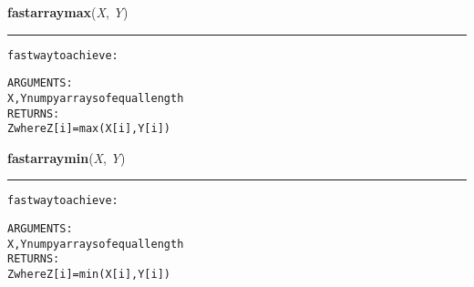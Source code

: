     \label{System:Utils:fastarraymax}

    \vspace{0.5ex}

\hspace{.8\funcindent}\begin{boxedminipage}{\funcwidth}

    \raggedright \textbf{fastarraymax}(\textit{X}, \textit{Y})

    \vspace{-1.5ex}

    \rule{\textwidth}{0.5\fboxrule}
\setlength{\parskip}{2ex}
\begin{alltt}

fast way to achieve: 

ARGUMENTS:
        X,Y numpy arrays of equal length
RETURNS:
        Z where Z[i] = max(X[i],Y[i])
\end{alltt}

\setlength{\parskip}{1ex}
    \end{boxedminipage}

    \label{System:Utils:fastarraymin}

    \vspace{0.5ex}

\hspace{.8\funcindent}\begin{boxedminipage}{\funcwidth}

    \raggedright \textbf{fastarraymin}(\textit{X}, \textit{Y})

    \vspace{-1.5ex}

    \rule{\textwidth}{0.5\fboxrule}
\setlength{\parskip}{2ex}
\begin{alltt}

fast way to achieve: 

ARGUMENTS:
        X,Y numpy arrays of equal length
RETURNS:
        Z where Z[i] = min(X[i],Y[i])
\end{alltt}

\setlength{\parskip}{1ex}
    \end{boxedminipage}

    \label{System:Utils:SimpleStack}

